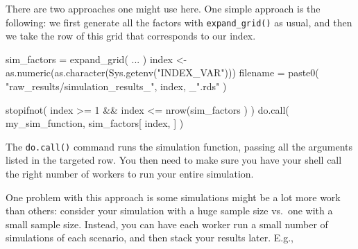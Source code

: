 \documentclass[
]{book}
\newenvironment{Shaded}{\begin{snugshade}}{\end{snugshade}}
\newcommand{\DecValTok}[1]{\textcolor[rgb]{0.00,0.00,0.81}{#1}}
\newcommand{\FunctionTok}[1]{\textcolor[rgb]{0.00,0.00,0.00}{#1}}
\newcommand{\NormalTok}[1]{#1}
\newcommand{\OtherTok}[1]{\textcolor[rgb]{0.56,0.35,0.01}{#1}}
\newcommand{\SpecialCharTok}[1]{\textcolor[rgb]{0.00,0.00,0.00}{#1}}
\newcommand{\StringTok}[1]{\textcolor[rgb]{0.31,0.60,0.02}{#1}}
\begin{document}
There are two approaches one might use here.
One simple approach is the following: we first generate all the factors with \texttt{expand\_grid()} as usual, and then we take the row of this grid that corresponds to our index.

\begin{Shaded}
\begin{Highlighting}[]
\NormalTok{sim\_factors }\OtherTok{=} \FunctionTok{expand\_grid}\NormalTok{( ... )}
\NormalTok{index }\OtherTok{\textless{}{-}} \FunctionTok{as.numeric}\NormalTok{(}\FunctionTok{as.character}\NormalTok{(}\FunctionTok{Sys.getenv}\NormalTok{(}\StringTok{"INDEX\_VAR"}\NormalTok{)))}
\NormalTok{filename }\OtherTok{=} \FunctionTok{paste0}\NormalTok{( }\StringTok{"raw\_results/simulation\_results\_"}\NormalTok{, index, \_}\StringTok{".rds"}\NormalTok{ )}

\FunctionTok{stopifnot}\NormalTok{( index }\SpecialCharTok{\textgreater{}=} \DecValTok{1} \SpecialCharTok{\&\&}\NormalTok{ index }\SpecialCharTok{\textless{}=} \FunctionTok{nrow}\NormalTok{(sim\_factors ) )}
\FunctionTok{do.call}\NormalTok{( my\_sim\_function, sim\_factors[ index, ] )}
\end{Highlighting}
\end{Shaded}

The \texttt{do.call()} command runs the simulation function, passing all the arguments listed in the targeted row.
You then need to make sure you have your shell call the right number of workers to run your entire simulation.

One problem with this approach is some simulations might be a lot more work than others: consider your simulation with a huge sample size vs.~one with a small sample size.
Instead, you can have each worker run a small number of simulations of each scenario, and then stack your results later.
E.g.,

\begin{Shaded}
\end{Shaded}
\end{document}

